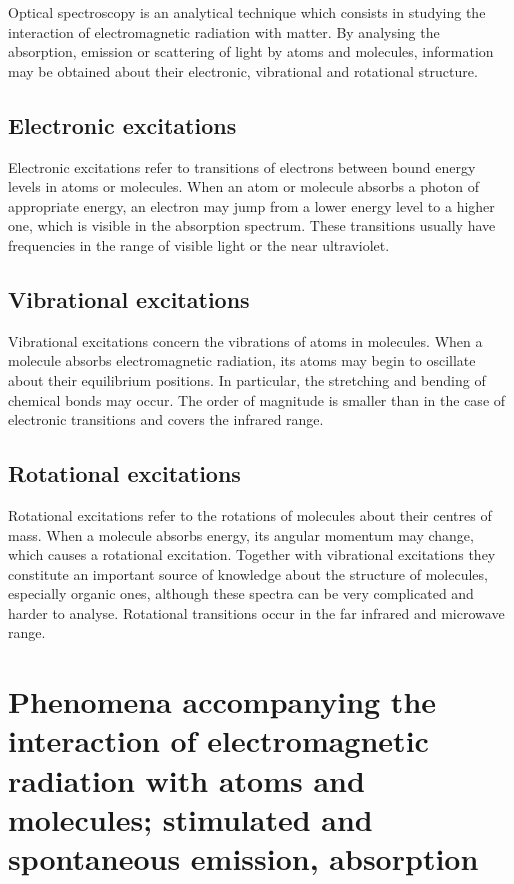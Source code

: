 Optical spectroscopy is an analytical technique which consists in studying the interaction of electromagnetic radiation with matter. By analysing the absorption, emission or scattering of light by atoms and molecules, information may be obtained about their electronic, vibrational and rotational structure.

\subsection{Electronic excitations}

Electronic excitations refer to transitions of electrons between bound energy levels in atoms or molecules. When an atom or molecule absorbs a photon of appropriate energy, an electron may jump from a lower energy level to a higher one, which is visible in the absorption spectrum. These transitions usually have frequencies in the range of visible light or the near ultraviolet.

\subsection{Vibrational excitations}

Vibrational excitations concern the vibrations of atoms in molecules. When a molecule absorbs electromagnetic radiation, its atoms may begin to oscillate about their equilibrium positions. In particular, the stretching and bending of chemical bonds may occur. The order of magnitude is smaller than in the case of electronic transitions and covers the infrared range.

\subsection{Rotational excitations}

Rotational excitations refer to the rotations of molecules about their centres of mass. When a molecule absorbs energy, its angular momentum may change, which causes a rotational excitation. Together with vibrational excitations they constitute an important source of knowledge about the structure of molecules, especially organic ones, although these spectra can be very complicated and harder to analyse. Rotational transitions occur in the far infrared and microwave range.

\section{Phenomena accompanying the interaction of electromagnetic radiation with atoms and molecules; stimulated and spontaneous emission, absorption}

